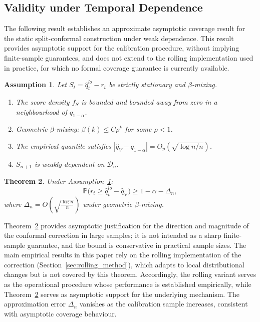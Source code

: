 \documentclass[preprint,11pt,authoryear]{elsarticle}
\newtheorem{theorem}{Theorem}[section]
\newtheorem{assumption}[theorem]{Assumption}
\newcommand{\1}{\boldsymbol{1}}
\newcommand{\qV}{\hat{q}_{\scriptscriptstyle\mathrm{V}}}
\begin{document}
	\subsection{Validity under Temporal Dependence}
	\label{sec:validity}
	
	The following result establishes an approximate asymptotic coverage result for the static split-conformal construction under
	weak dependence. This result provides asymptotic support for the calibration procedure, without implying finite-sample guarantees, and does not extend to the rolling implementation used in practice, for which no formal coverage guarantee is currently available.

	\begin{assumption}\label{ass:main}
		Let $S_t = \hat{q}^{lo}_t - r_t$ be strictly stationary and $\beta$-mixing.
		\begin{enumerate}[label=\textup{(A\arabic*)}]
			\item\label{ass:density} The score density $f_S$ is bounded and bounded away from zero in a neighbourhood of $q_{1-\alpha}$.
			\item\label{ass:mixing} Geometric $\beta$-mixing: $\beta(k) \leq C\rho^k$ for some $\rho < 1$.
			\item\label{ass:quantile} The empirical quantile satisfies $|\hat{q}_V - q_{1-\alpha}| = O_p(\sqrt{\log n / n})$.
			\item\label{ass:weak_dep} $S_{n+1}$ is weakly dependent on $\mathcal{D}_n$.
		\end{enumerate}
	\end{assumption}

	\begin{theorem}
		\label{thm:dependent_conformal_var}
		Under Assumption~\ref{ass:main}:
		\[
		\mathbb{P}\big(r_{t} \geq \hat{q}_t^{lo} - \qV\big)
		\ge 1 - \alpha - \Delta_n,
		\]
		where $\Delta_n = O\!\left(\sqrt{\frac{\log n}{n}}\right)$
		under geometric $\beta$-mixing.
	\end{theorem}
	
	Theorem~\ref{thm:dependent_conformal_var} provides asymptotic justification for the direction and magnitude of the conformal correction in large samples; it is not intended as a sharp finite-sample guarantee, and the bound is conservative in practical sample sizes. The main empirical results in this paper rely on the rolling implementation of the correction (Section~\ref{sec:rolling_method}), which adapts to local distributional changes but is not covered by this theorem. Accordingly, the rolling variant serves as the operational procedure whose performance is established empirically, while Theorem~\ref{thm:dependent_conformal_var} serves as asymptotic support for the underlying mechanism. The approximation error $\Delta_n$ vanishes as the calibration sample increases, consistent with asymptotic coverage behaviour.
\end{document}
